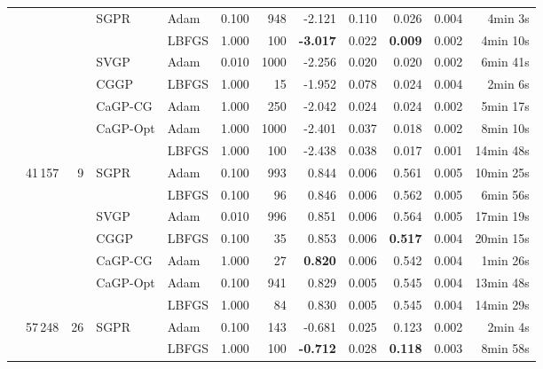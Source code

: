 \begin{tabular}{lrrllrrrrrrr}
 &  &  & \textcolor{SGPR}{SGPR} & Adam & 0.100 & 948 & -2.121 & 0.110 & 0.026 & 0.004 & 4min \phantom{0}3s\\
 &  &  &  & LBFGS & 1.000 & 100 & \textcolor{SGPR}{\bfseries-3.017} & 0.022 & \textcolor{SGPR}{\bfseries0.009} & 0.002 & 4min 10s\\
 &  &  & \textcolor{SVGP}{SVGP} & Adam & 0.010 & 1000 & -2.256 & 0.020 & 0.020 & 0.002 & 6min 41s\\
 &  &  & \textcolor{CGGP}{CGGP} & LBFGS & 1.000 & 15 & -1.952 & 0.078 & 0.024 & 0.004 & 2min \phantom{0}6s\\
 &  &  & \textcolor{CaGP-CG}{CaGP-CG} & Adam & 1.000 & 250 & -2.042 & 0.024 & 0.024 & 0.002 & 5min 17s\\
 &  &  & \multirow[t]{2}{*}{\textcolor{CaGP-Opt}{CaGP-Opt}} & Adam & 1.000 & 1000 & -2.401 & 0.037 & 0.018 & 0.002 & 8min 10s\\
 &  &  &  & LBFGS & 1.000 & 100 & -2.438 & 0.038 & 0.017 & 0.001 & 14min 48s\\
 \arrayrulecolor{lightgray}\cmidrule(lr){1-12}
 \multirow[t]{6}{*}{Protein \citep{Rana2013PhysiochemicalProperties}} & \multirow[t]{6}{*}{41\,157} & \multirow[t]{6}{*}{9} & \multirow[t]{2}{*}{\textcolor{SGPR}{SGPR}} & Adam & 0.100 & 993 & 0.844 & 0.006 & 0.561 & 0.005 & 10min 25s\\
 &  &  &  & LBFGS & 0.100 & 96 & 0.846 & 0.006 & 0.562 & 0.005 & 6min 56s\\
 &  &  & \textcolor{SVGP}{SVGP} & Adam & 0.010 & 996 & 0.851 & 0.006 & 0.564 & 0.005 & 17min 19s\\
 &  &  & \textcolor{CGGP}{CGGP} & LBFGS & 0.100 & 35 & 0.853 & 0.006 & \textcolor{CGGP}{\bfseries0.517} & 0.004 & 20min 15s\\
 &  &  & \textcolor{CaGP-CG}{CaGP-CG} & Adam & 1.000 & 27 & \textcolor{CaGP-CG}{\bfseries0.820} & 0.006 & 0.542 & 0.004 & 1min 26s\\
 &  &  & \multirow[t]{2}{*}{\textcolor{CaGP-Opt}{CaGP-Opt}} & Adam & 0.100 & 941 & 0.829 & 0.005 & 0.545 & 0.004 & 13min 48s\\
 &  &  &  & LBFGS & 1.000 & 84 & 0.830 & 0.005 & 0.545 & 0.004 & 14min 29s\\
 \arrayrulecolor{lightgray}\cmidrule(lr){1-12}
 \multirow[t]{6}{*}{KEGGu \citep{Naeem2011KEGG}} & \multirow[t]{6}{*}{57\,248} & \multirow[t]{6}{*}{26} &  \multirow[t]{2}{*}{\textcolor{SGPR}{SGPR}} & Adam & 0.100 & 143 & -0.681 & 0.025 & 0.123 & 0.002 & 2min \phantom{0}4s\\
 &  &  &  & LBFGS & 1.000 & 100 & \textcolor{SGPR}{\bfseries-0.712} & 0.028 & \textcolor{SGPR}{\bfseries0.118} & 0.003 & 8min 58s\\

\end{tabular}
